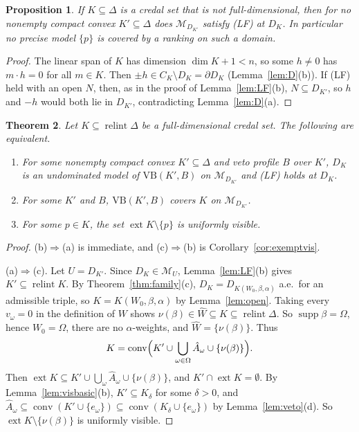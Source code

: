 \documentclass[11pt]{article}
\newcommand{\M}{\mathcal{M}}
\newcommand{\VB}{\mathrm{VB}}
\DeclareMathOperator{\conv}{conv}
\DeclareMathOperator{\relint}{relint}
\DeclareMathOperator{\supp}{supp}
\DeclareMathOperator{\ext}{ext}
\theoremstyle{plain}
\newtheorem{theorem}{Theorem}[section]
\newtheorem{proposition}[theorem]{Proposition}
\theoremstyle{definition}
\theoremstyle{remark}
\begin{document}
\begin{proposition}\label{prop:lowdim}
If $K\subseteq\Delta$ is a credal set that is not full-dimensional, then for no nonempty
compact convex $K'\subseteq\Delta$ does $\M_{D_{K'}}$ satisfy (LF) at $D_K$. In particular
no precise model $\{p\}$ is covered by a ranking on such a domain.
\end{proposition}

\begin{proof}
The linear span of $K$ has dimension $\dim K+1<n$, so some $h\neq0$ has $m\cdot h=0$ for
all $m\in K$. Then $\pm h\in C_K\setminus D_K=\partial D_K$ (Lemma~\ref{lem:D}(b)). If (LF)
held with an open $N$, then, as in the proof of Lemma~\ref{lem:LF}(b), $N\subseteq D_{K'}$,
so $h$ and $-h$ would both lie in $D_{K'}$, contradicting Lemma~\ref{lem:D}(a).
\end{proof}

\begin{theorem}\label{thm:reach}
Let $K\subseteq\relint\Delta$ be a full-dimensional credal set. The following are
equivalent.
\begin{enumerate}[label=(\alph*)]
  \item For some nonempty compact convex $K'\subseteq\Delta$ and veto profile $B$ over $K'$,
  $D_K$ is an undominated model of $\VB(K',B)$ on $\M_{D_{K'}}$ and (LF) holds at $D_K$.
  \item For some $K'$ and $B$, $\VB(K',B)$ covers $K$ on $\M_{D_{K'}}$.
  \item For some $p\in K$, the set $\ext K\setminus\{p\}$ is uniformly visible.
\end{enumerate}
\end{theorem}

\begin{proof}
(b)$\Rightarrow$(a) is immediate, and (c)$\Rightarrow$(b) is
Corollary~\ref{cor:exemptvis}.

(a)$\Rightarrow$(c). Let $U=D_{K'}$. Since $D_K\in\M_U$, Lemma~\ref{lem:LF}(b) gives
$K'\subseteq\relint K$. By Theorem~\ref{thm:family}(c), $D_K=D_{K(W_0,\beta,\alpha)}$ a.e.\
for an admissible triple, so $K=K(W_0,\beta,\alpha)$ by Lemma~\ref{lem:open}. Taking every
$v_\omega=0$ in the definition of $W$ shows $\nu(\beta)\in\hat W\subseteq K\subseteq
\relint\Delta$. So $\supp\beta=\Omega$, hence $W_0=\Omega$, there are no
$\alpha$-weights, and $\hat W=\{\nu(\beta)\}$. Thus
\[
  K=\conv\Bigl(K'\cup\bigcup_{\omega\in\Omega}\hat A_\omega\cup\{\nu(\beta)\}\Bigr).
\]
Then $\ext K\subseteq K'\cup\bigcup_\omega\hat A_\omega\cup\{\nu(\beta)\}$, and
$K'\cap\ext K=\emptyset$. By Lemma~\ref{lem:visbasic}(b), $K'\subseteq K_\delta$ for some
$\delta>0$, and $\hat A_\omega\subseteq\conv(K'\cup\{e_\omega\})\subseteq\conv(K_\delta
\cup\{e_\omega\})$ by Lemma~\ref{lem:veto}(d). So $\ext K\setminus\{\nu(\beta)\}$ is
uniformly visible.
\end{proof}
\end{document}
